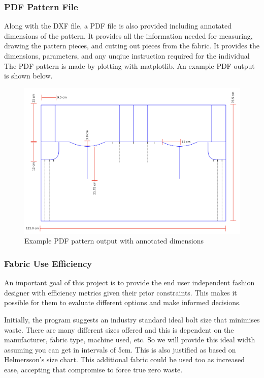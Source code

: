 \subsubsection{PDF Pattern File}
Along with the DXF file, a PDF file is also provided including annotated dimensions of the pattern. It provides all the information needed for measuring, drawing the pattern pieces, and cutting out pieces from the fabric. It provides the dimensions, parameters, and any unqiue instruction required for the individual The PDF pattern is made by plotting with matplotlib. An example PDF output is shown below.
\begin{figure} [H]
    \centering
    \includegraphics[width = \textwidth]{Images/example pdf output.png}
    \caption{Example PDF pattern output with annotated dimensions}
    \label{fig:pdf output}
\end{figure}


\subsubsection{Fabric Use Efficiency}
An important goal of this project is to provide the end user independent fashion designer with efficiency metrics given their prior constraints. This makes it possible for them to evaluate different options and make informed decisions.

Initially, the program suggests an industry standard ideal bolt size that minimises waste. There are many different sizes offered and this is dependent on the manufacturer, fabric type, machine used, etc. So we will provide this ideal width assuming you can get in intervals of 5cm. This is also justified as based on Helmersson's size chart. This additional fabric could be used too as increased ease, accepting that compromise to force true zero waste.

